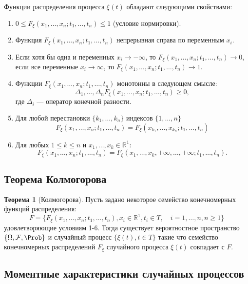 \documentclass[12pt]{report}
\theoremstyle{definition}
\newtheorem{theorem}{Теорема}[chapter]
\newcommand{\R}{\mathbb R}
\newcommand{\F}{\mathcal F}
\begin{document}
Функции распределения процесса $\xi(t)$ обладают следующими свойствами:

\begin{enumerate}

\item $0 \le F_\xi(x_1, \dots, x_n; t_1, \dots, t_n) \le 1$
  (условие нормировки).

\item Функция $F_\xi(x_1, \dots, x_n; t_1, \dots, t_n)$
  непрерывная справа по переменным $x_i$.

\item Если хотя бы одна и переменных $x_i \rightarrow -\infty$, то
$F_\xi(x_1, \dots, x_n; t_1, \dots, t_n) \rightarrow 0$,
если все переменные $x_i \rightarrow \infty$, то
$F_\xi(x_1, \dots, x_n; t_1, \dots, t_n) \rightarrow 1$.

\item Функции $F_\xi(x_1, \dots, x_n; t_1, \dots, t_n)$ монотонны
в следующем смысле:
$$\Delta_1, \dots, \Delta_n F_\xi(x_1, \dots, x_n; t_1, \dots, t_n) \ge 0,
$$
где $\Delta_i$ --- оператор конечной разности.

\item Для любой перестановки $\{k_1, \dots, k_n\}$ индексов $\{1, \dots, n\}$
$$
F_\xi(x_1, \dots, x_n; t_1, \dots, t_n) = 
F_\xi(x_{k_1}, \dots, x_{k_n}; t_1, \dots, t_n)
$$

\item Для любых $1 \le k \le n$ и $x_1, \dots, x_k \in \R^1$:
$$
F_\xi(x_1, \dots, x_n; t_1, \dots, t_n) =
F_\xi(x_1, \dots, x_k, +\infty, \dots, +\infty; t_1, \dots, t_n).
$$
\end{enumerate}

\subsection{Теорема Колмогорова}
\begin{theorem}[Колмогорова]
Пусть задано некоторое семейство конечномерных функций
распределения:
$$
F = \{F_\xi(x_1, \dots, x_n; t_1, \dots, t_n), x_i \in \R^1,
t_i \in T,\quad i = 1, \dots, n, n \ge 1\}
$$
удовлетворяющие условиям 1-6. Тогда существует вероятностное
пространство $\{\Omega, \F, \Prob\}$ и случайный процесс
$\{\xi(t), t\in T\}$ такие что семейство конечномерных распределений
$F_\xi$ случайного процесса $\xi(t)$ совпадает с $F$.
\end{theorem}

\subsection{Моментные характеристики случайных процессов}
\end{document}
